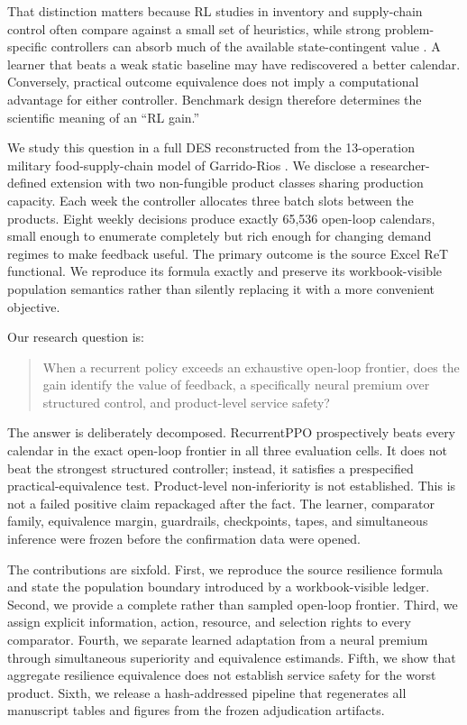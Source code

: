 \documentclass[preprint,12pt]{elsarticle}
\begin{document}
That distinction matters because RL studies in inventory and supply-chain control often compare against a small set of heuristics, while strong problem-specific controllers can absorb much of the available state-contingent value \cite{boute2022,gijsbrechts2022,powell2022}. A learner that beats a weak static baseline may have rediscovered a better calendar. Conversely, practical outcome equivalence does not imply a computational advantage for either controller. Benchmark design therefore determines the scientific meaning of an ``RL gain.''

We study this question in a full DES reconstructed from the 13-operation military food-supply-chain model of Garrido-Rios \cite{garrido2017}. We disclose a researcher-defined extension with two non-fungible product classes sharing production capacity. Each week the controller allocates three batch slots between the products. Eight weekly decisions produce exactly 65,536 open-loop calendars, small enough to enumerate completely but rich enough for changing demand regimes to make feedback useful. The primary outcome is the source Excel ReT functional. We reproduce its formula exactly and preserve its workbook-visible population semantics rather than silently replacing it with a more convenient objective.

Our research question is:

\begin{quote}
When a recurrent policy exceeds an exhaustive open-loop frontier, does the gain identify the value of feedback, a specifically neural premium over structured control, and product-level service safety?
\end{quote}

The answer is deliberately decomposed. RecurrentPPO prospectively beats every calendar in the exact open-loop frontier in all three evaluation cells. It does not beat the strongest structured controller; instead, it satisfies a prespecified practical-equivalence test. Product-level non-inferiority is not established. This is not a failed positive claim repackaged after the fact. The learner, comparator family, equivalence margin, guardrails, checkpoints, tapes, and simultaneous inference were frozen before the confirmation data were opened.

The contributions are sixfold. First, we reproduce the source resilience formula and state the population boundary introduced by a workbook-visible ledger. Second, we provide a complete rather than sampled open-loop frontier. Third, we assign explicit information, action, resource, and selection rights to every comparator. Fourth, we separate learned adaptation from a neural premium through simultaneous superiority and equivalence estimands. Fifth, we show that aggregate resilience equivalence does not establish service safety for the worst product. Sixth, we release a hash-addressed pipeline that regenerates all manuscript tables and figures from the frozen adjudication artifacts.
\end{document}
